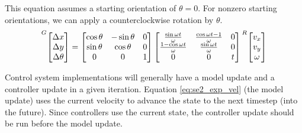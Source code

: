 This equation assumes a starting orientation of $\theta = 0$. For nonzero
starting orientations, we can apply a counterclockwise rotation by $\theta$.
\begin{equation}
  \prescript{G}{}{\begin{bmatrix}
    \Delta x \\
    \Delta y \\
    \Delta \theta
  \end{bmatrix}} =
  \begin{bmatrix}
    \cos\theta & -\sin\theta & 0 \\
    \sin\theta &  \cos\theta & 0 \\
             0 &           0 & 1
  \end{bmatrix}
  \begin{bmatrix}
    \frac{\sin\omega t}{\omega} & \frac{\cos\omega t - 1}{\omega} & 0 \\
    \frac{1 - \cos\omega t}{\omega} & \frac{\sin\omega t}{\omega} & 0 \\
    0 & 0 & t
  \end{bmatrix}
  \prescript{R}{}{\begin{bmatrix}
    v_x \\
    v_y \\
    \omega
  \end{bmatrix}}
  \label{eq:se2_exp_vel}
\end{equation}
\begin{remark}
  Control system implementations will generally have a model update and a
  controller update in a given iteration. Equation \eqref{eq:se2_exp_vel} (the
  model update) uses the current velocity to advance the state to the next
  timestep (into the future). Since controllers use the current state, the
  controller update should be run before the model update.
\end{remark}

